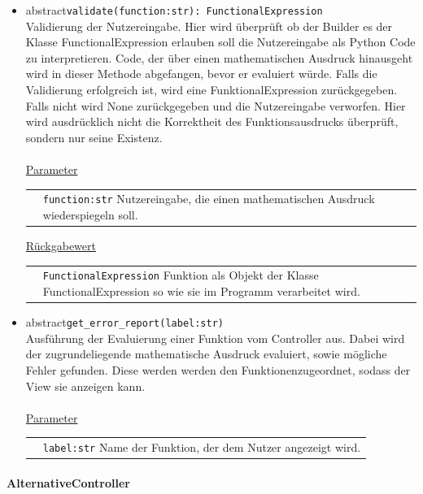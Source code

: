 \documentclass{article}
\newcommand{\classheader}[2][]{\paragraph{#2}
\mbox{}\textit{#1}\\\\}
\begin{document}
\begin{itemize}
\item \flqq{}abstract\frqq \texttt{validate(function:str): FunctionalExpression}\\ Validierung der Nutzereingabe. Hier wird überprüft ob der Builder es der Klasse FunctionalExpression erlauben soll die Nutzereingabe als Python Code zu interpretieren. Code, der über einen mathematischen Ausdruck hinausgeht wird in dieser Methode abgefangen, bevor er evaluiert würde. Falls die Validierung erfolgreich ist, wird eine FunktionalExpression zurückgegeben. Falls nicht wird None zurückgegeben und die Nutzereingabe verworfen. Hier wird ausdrücklich nicht die Korrektheit des Funktionsausdrucks überprüft, sondern nur seine Existenz.\\\\
\underline{{Parameter}}\\
\begin{tabular}{lp{10.7cm}}
 & \texttt{function:str}  Nutzereingabe, die einen mathematischen Ausdruck wiederspiegeln soll. \\
\end{tabular}
\newline\newline
\underline{{Rückgabewert}}\\
\begin{tabular}{lp{10.7cm}}
 & \texttt{FunctionalExpression} Funktion als Objekt der Klasse FunctionalExpression so wie sie im Programm verarbeitet wird. \\
\end{tabular}


\item \flqq{}abstract\frqq \texttt{get\_error\_report(label:str)}\\ Ausführung der Evaluierung einer Funktion vom Controller aus. Dabei wird der zugrundeliegende mathematische Ausdruck evaluiert, sowie mögliche Fehler gefunden. Diese werden werden den Funktionenzugeordnet, sodass der View sie anzeigen kann. \\\\
\underline{{Parameter}}\\
\begin{tabular}{lp{10.7cm}}
 & \texttt{label:str} Name der Funktion, der dem Nutzer angezeigt wird. \\
\end{tabular}
\end{itemize}


\newpage
\classheader{AlternativeController}\label{cls:AlternativeController}
\end{document}
